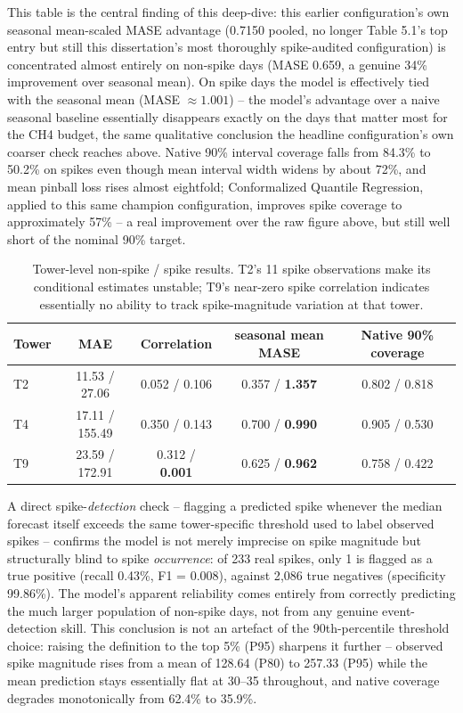 This table is the central finding of this deep-dive: this earlier configuration's own seasonal
mean-scaled MASE advantage (0.7150 pooled, no longer Table 5.1's top entry but still this
dissertation's most thoroughly spike-audited configuration) is concentrated almost entirely on
non-spike days (MASE 0.659, a genuine 34\% improvement over seasonal mean). On spike days the model
is effectively tied with the seasonal mean (MASE $\approx 1.001$) -- the model's advantage over a
naive seasonal baseline essentially disappears exactly on the days that matter most for the CH4
budget, the same qualitative conclusion the headline configuration's own coarser check reaches
above. Native
90\% interval coverage falls from 84.3\% to 50.2\% on spikes even though mean interval width
widens by about 72\%, and mean pinball loss rises almost eightfold; Conformalized Quantile
Regression, applied to this same champion configuration, improves spike coverage to approximately
57\% -- a real improvement over the raw figure above, but still well short of the nominal 90\%
target.

\begin{table}[htbp]
\centering
\footnotesize
\begin{tabular}{lcccc}
\toprule
Tower & MAE & Correlation & seasonal mean MASE & Native 90\% coverage \\
\midrule
T2 & 11.53 / 27.06 & 0.052 / 0.106 & 0.357 / \textbf{1.357} & 0.802 / 0.818 \\
T4 & 17.11 / 155.49 & 0.350 / 0.143 & 0.700 / \textbf{0.990} & 0.905 / 0.530 \\
T9 & 23.59 / 172.91 & 0.312 / \textbf{0.001} & 0.625 / \textbf{0.962} & 0.758 / 0.422 \\
\bottomrule
\end{tabular}
\caption{Tower-level non-spike / spike results. T2's 11 spike observations make its conditional
estimates unstable; T9's near-zero spike correlation indicates essentially no ability to track
spike-magnitude variation at that tower.}
\end{table}

A direct spike-\emph{detection} check -- flagging a predicted spike whenever the median forecast
itself exceeds the same tower-specific threshold used to label observed spikes -- confirms the
model is not merely imprecise on spike magnitude but structurally blind to spike \emph{occurrence}:
of 233 real spikes, only 1 is flagged as a true positive (recall 0.43\%, F1 = 0.008), against 2{,}086
true negatives (specificity 99.86\%). The model's apparent reliability comes entirely from correctly
predicting the much larger population of non-spike days, not from any genuine event-detection skill.
This conclusion is not an artefact of the 90th-percentile threshold choice: raising the definition
to the top 5\% (P95) sharpens it further -- observed spike magnitude rises from a mean of 128.64
(P80) to 257.33 (P95) while the mean prediction stays essentially flat at 30--35 throughout, and
native coverage degrades monotonically from 62.4\% to 35.9\%.

